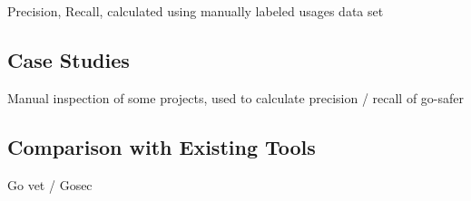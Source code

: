 Precision, Recall, calculated using manually labeled usages data set



\subsection{Case Studies}\label{subsec:go-safer:evaluation:case-studies}

Manual inspection of some projects, used to calculate precision / recall of go-safer



\subsection{Comparison with Existing Tools}\label{subsec:go-safer:evaluation:linters-comparison}

Go vet / Gosec
